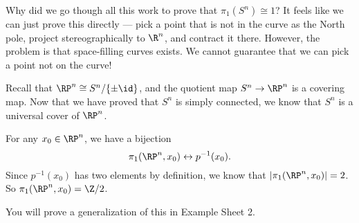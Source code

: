 \documentclass[a4paper]{article}
\begin{document}
Why did we go though all this work to prove that $\pi_1(S^n) \cong 1$? It feels like we can just prove this directly --- pick a point that is not in the curve as the North pole, project stereographically to $\R^n$, and contract it there. However, the problem is that space-filling curves exists. We cannot guarantee that we can pick a point not on the curve!

\begin{eg}[$\RP^n$]
  Recall that $\RP^n \cong S^n/\{\pm \id\}$, and the quotient map $S^n \to \RP^n$ is a covering map. Now that we have proved that $S^n$ is simply connected, we know that $S^n$ is a universal cover of $\RP^n$.

  For any $x_0 \in \RP^n$, we have a bijection
  \[
    \pi_1(\RP^n, x_0) \leftrightarrow p^{-1}(x_0).
  \]
  Since $p^{-1}(x_0)$ has two elements by definition, we know that $|\pi_1(\RP^n, x_0)| = 2$. So $\pi_1(\RP^n, x_0) = \Z/2$.
\end{eg}
You will prove a generalization of this in Example Sheet 2.
\end{document}
